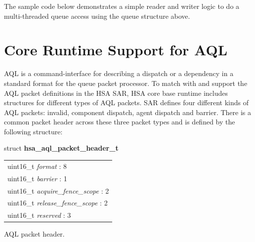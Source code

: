 \documentclass{book}
\newcommand{\hsaarg}[1]{\textit{#1}}
\newcommand{\hsadef}[2]{\hypertarget{#1}{\textbf{#2}}}
\begin{document}
The sample code below demonstrates a simple reader and writer logic
to do a multi-threaded queue access using the queue structure above.




\hypertarget{coreapi_AQL}{}\section{Core Runtime Support for
AQL}\label{AQL}
AQL is a command-interface for describing a dispatch or a dependency
in a standard format for the queue packet processor.
To match with and support the AQL packet definitions in the HSA SAR,
HSA core base runtime includes structures for different types of AQL
packets.  SAR defines four different kinds of AQL packets: invalid,
component dispatch, agent dispatch and barrier.  There is a common
packet header across these three packet types and is defined by the
following structure:

\makeatletter{}

\noindent\begin{tcolorbox}[nobeforeafter,arc=0mm,colframe=white,colback=lightgray,left=0mm]
struct \hsadef{group__STR__aql__header_1ga92558e047d003985bae2558febd3dd40}{hsa\_aql\_packet\_header\_t} \\
\begin{tabular}{@{}l}
\hspace{1.7em}uint16\_t \hsaarg{format} : 8\\
\hspace{1.7em}uint16\_t \hsaarg{barrier} : 1\\
\hspace{1.7em}uint16\_t \hsaarg{acquire\_fence\_scope} : 2\\
\hspace{1.7em}uint16\_t \hsaarg{release\_fence\_scope} : 2\\
\hspace{1.7em}uint16\_t \hsaarg{reserved} : 3
\end{tabular}

\end{tcolorbox}
AQL packet header.
\end{document}
